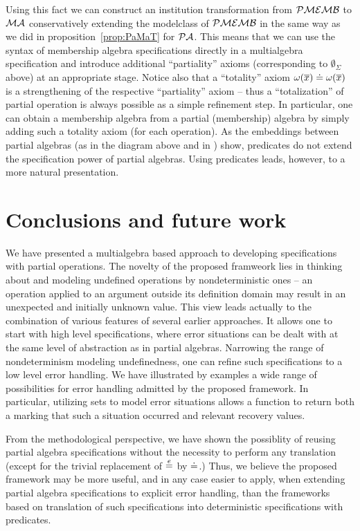 \documentclass[10pt]{article}
\begin{document}
%
Using this fact we can construct an institution transformation from
${\mathcal{PMEMB}}$ to ${\mathcal{MA}}$ conservatively extending the modelclass of
${\mathcal{PMEMB}}$ in the same way as we did in proposition~\ref{prop:PaMaT} for
${\mathcal{PA}}$. This means that we can use the syntax of membership algebra
specifications directly in a multialgebra specification and introduce
additional ``partiality'' axioms (corresponding to $\emptyset_\Sigma$ above)
at an appropriate stage. Notice also that a ``totality'' axiom
$\omega(\overline x)\mathrel{\dot{=} }\omega(\overline x)$ is a strengthening of the
respective ``partiality'' axiom -- thus a ``totalization'' of partial
operation is always possible as a simple refinement step. In particular, one
can obtain a membership algebra from a partial (membership) algebra  by
simply adding such a totality axiom (for each operation).
 As the embeddings
between partial algebras (as in the diagram above and in \cite{mossa}) show,
predicates do not extend the specification power of partial algebras. Using
predicates leads, however, to a more natural presentation.

\section{Conclusions and future work}
We have presented a multialgebra based approach to developing specifications
with partial operations. The novelty of the proposed framweork lies in
thinking about and modeling undefined operations by nondeterministic ones --
an operation applied to an argument outside its definition domain may result
in an unexpected and initially unknown value. This view leads actually
to the combination of various features of several earlier approaches. It
allows one to start with high level specifications, where error
situations can be dealt with at the same level of abstraction as in partial
algebras. Narrowing the range of nondeterminism modeling undefinedness, one
can refine such specifications to a low level error handling. 
We have illustrated by examples a wide range of possibilities for error
handling admitted by the proposed framework. In particular, utilizing sets to
model error situations allows a function to return both a marking that such a
situation occurred and relevant recovery values.

From the methodological perspective, we have shown the possiblity of
reusing partial algebra specifications without the necessity to perform any
translation (except for the trivial replacement of $\stackrel{e}{=}$ by $\mathrel{\dot{=} }$.)
Thus,
we believe the proposed framework may be more useful, and in any case easier
to apply, when extending partial algebra specifications to explicit error
handling, than the frameworks based on translation of such specifications into
deterministic specifications with predicates.
\end{document}
